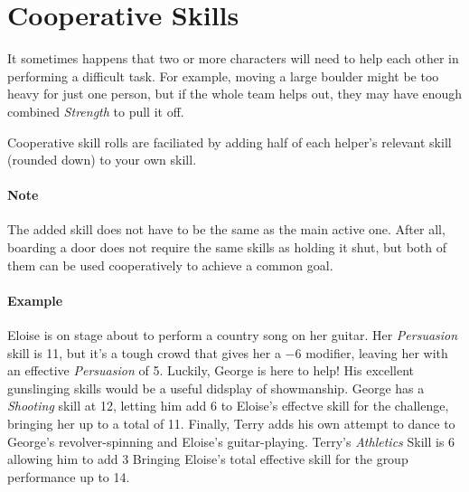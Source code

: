 \section{Cooperative Skills}
It sometimes happens that two or more characters will need to help each other in performing a difficult task.
For example, moving a large boulder might be too heavy for just one person, but if the whole team helps out, they may have enough combined \textit{Strength} to pull it off.

Cooperative skill rolls are faciliated by adding half of each helper's relevant skill (rounded down) to your own skill.

\paragraph{Note} The added skill does not have to be the same as the main active one. 
After all, boarding a door does not require the same skills as holding it shut, but both of them can be used cooperatively to achieve a common goal.

\paragraph{Example}
Eloise is on stage about to perform a country song on her guitar.
Her \textit{Persuasion} skill is 11, but it's a tough crowd that gives her a $-6$ modifier, leaving her with an effective \textit{Persuasion} of 5.
Luckily, George is here to help!
His excellent gunslinging skills would be a useful didsplay of showmanship.
George has a \textit{Shooting} skill at 12, letting him add 6 to Eloise's effectve skill for the challenge, bringing her up to a total of 11.
Finally, Terry adds his own attempt to dance to George's revolver-spinning and Eloise's guitar-playing. 
Terry's \textit{Athletics} Skill is 6 allowing him to add 3 Bringing Eloise's total effective skill for the group performance up to 14.